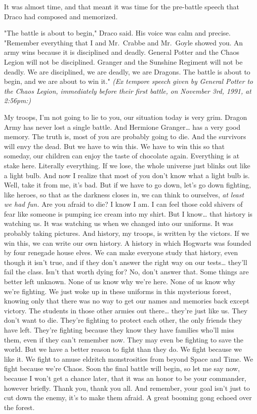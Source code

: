 It was almost time, and that meant it was time for the pre-battle speech that Draco had composed and memorized.

"The battle is about to begin," Draco said. His voice was calm and precise. "Remember everything that I and Mr.~Crabbe and Mr.~Goyle showed you. An army wins because it is disciplined and deadly. General Potter and the Chaos Legion will not be disciplined. Granger and the Sunshine Regiment will not be deadly. We are disciplined, we are deadly, we are Dragons. The battle is about to begin, and we are about to win it."
\sbreak
\emph{(Ex tempore speech given by General Potter to the Chaos Legion, immediately before their first battle, on November 3rd, 1991, at 2:56pm:)}

My troops, I'm not going to lie to you, our situation today is very grim. Dragon Army has never lost a single battle. And Hermione Granger{\ldots} has a very good memory. The truth is, most of you are probably going to die. And the survivors will envy the dead. But we have to win this. We have to win this so that someday, our children can enjoy the taste of chocolate again. Everything is at stake here. Literally everything. If we lose, the whole universe just blinks out like a light bulb. And now I realize that most of you don't know what a light bulb is. Well, take it from me, it's bad. But if we have to go down, let's go down fighting, like heroes, so that as the darkness closes in, we can think to ourselves, \emph{at least we had fun.} Are you afraid to die? I know I am. I can feel those cold shivers of fear like someone is pumping ice cream into my shirt. But I know{\ldots} that history is watching us. It was watching us when we changed into our uniforms. It was probably taking pictures. And history, my troops, is written by the victors. If we win this, we can write our own history. A history in which Hogwarts was founded by four renegade house elves. We can make everyone study that history, even though it isn't true, and if they don't answer the right way on our tests{\ldots} they'll fail the class. Isn't that worth dying for? No, don't answer that. Some things are better left unknown. None of us know why we're here. None of us know why we're fighting. We just woke up in these uniforms in this mysterious forest, knowing only that there was no way to get our names and memories back except victory. The students in those other armies out there{\ldots} they're just like us. They don't want to die. They're fighting to protect each other, the only friends they have left. They're fighting because they know they have families who'll miss them, even if they can't remember now. They may even be fighting to save the world. But we have a better reason to fight than they do. We fight because we like it. We fight to amuse eldritch monstrosities from beyond Space and Time. We fight because we're Chaos. Soon the final battle will begin, so let me say now, because I won't get a chance later, that it was an honor to be your commander, however briefly. Thank you, thank you all. And remember, your goal isn't just to cut down the enemy, it's to make them afraid.
\sbreak
A great booming gong echoed over the forest.


